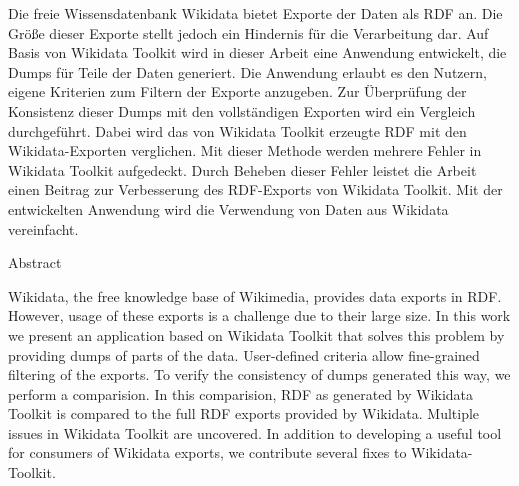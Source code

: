 %
\label{sec:abstract}
Die freie Wissensdatenbank Wikidata bietet Exporte der Daten als RDF an.
Die Größe dieser Exporte stellt jedoch ein Hindernis für die Verarbeitung dar.
Auf Basis von Wikidata Toolkit wird in dieser Arbeit eine Anwendung entwickelt, die Dumps für Teile der Daten generiert.
Die Anwendung erlaubt es den Nutzern, eigene Kriterien zum Filtern der Exporte anzugeben.
Zur Überprüfung der Konsistenz dieser Dumps mit den vollständigen Exporten wird ein Vergleich durchgeführt.
Dabei wird das von Wikidata Toolkit erzeugte RDF mit den Wikidata-Exporten verglichen.
Mit dieser Methode werden mehrere Fehler in Wikidata Toolkit aufgedeckt.
Durch Beheben dieser Fehler leistet die Arbeit einen Beitrag zur Verbesserung des RDF-Exports von Wikidata Toolkit.
Mit der entwickelten Anwendung wird die Verwendung von Daten aus Wikidata vereinfacht.

\vspace*{20mm}

{Abstract}
\label{sec:abstract-diff}

Wikidata, the free knowledge base of Wikimedia, provides data exports in RDF.
However, usage of these exports is a challenge due to their large size.
In this work we present an application based on Wikidata Toolkit that solves this problem by providing dumps of parts of the data.
User-defined criteria allow fine-grained filtering of the exports.
To verify the consistency of dumps generated this way, we perform a comparision.
In this comparision, RDF as generated by Wikidata Toolkit is compared to the full RDF exports provided by Wikidata.
Multiple issues in Wikidata Toolkit are uncovered.
In addition to developing a useful tool for consumers of Wikidata exports, we contribute several fixes to Wikidata-Toolkit.